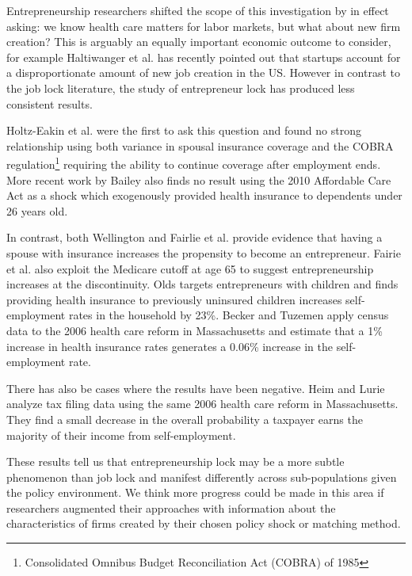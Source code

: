 Entrepreneurship researchers shifted the scope of this investigation by in effect asking: we know health care matters for labor markets, but what about new firm creation? This is arguably an equally important economic outcome to consider, for example Haltiwanger et al. \cite{haltiwanger} has recently pointed out that startups account for a disproportionate amount of new job creation in the US. However in contrast to the job lock literature, the study of entrepreneur lock has produced less consistent results. 

Holtz-Eakin et al. \cite{holtz_health} were the first to ask this question and found no strong relationship using both variance in spousal insurance coverage and the COBRA regulation\footnote{Consolidated Omnibus Budget Reconciliation Act (COBRA) of 1985} requiring the ability to continue coverage after employment ends. More recent work by Bailey \cite{bailey} also finds no result using the 2010 Affordable Care Act as a shock which exogenously provided health insurance to dependents under 26 years old. 

In contrast, both Wellington \cite{wellington} and Fairlie et al. \cite{fairlie_health} provide evidence that having a spouse with insurance increases the propensity to become an entrepreneur. Fairie et al. \cite{fairlie_health} also exploit the Medicare cutoff at age 65 to suggest entrepreneurship increases at the discontinuity. Olds \cite{olds} targets entrepreneurs with children and finds providing health insurance to previously uninsured children increases self-employment rates in the household by 23\%.  Becker and Tuzemen \cite{tuzemen} apply census data to the 2006 health care reform in Massachusetts and estimate that a 1\% increase in health insurance rates generates a 0.06\% increase in the self-employment rate. 

There has also be cases where the results have been negative. Heim and Lurie \cite{heimLurie} analyze tax filing data using the same 2006 health care reform in Massachusetts. They find a small decrease in the overall probability a taxpayer earns the majority of their income from self-employment.

These results tell us that entrepreneurship lock may be a more subtle phenomenon than job lock and manifest differently across sub-populations given the policy environment. We think more progress could be made in this area if researchers augmented their approaches with information about the characteristics of firms created by their chosen policy shock or matching method. 

